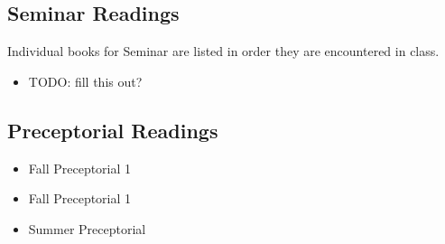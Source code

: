 \documentclass{article}
\begin{document}
\subsection{Seminar Readings}
Individual books for Seminar are listed in order they are encountered in class.

\begin{itemize}
	\item TODO: fill this out?
\end{itemize}

\subsection{Preceptorial Readings}
\begin{itemize}
	\item Fall Preceptorial 1
	      \fallPreceptOneReadingList%
	\item Fall Preceptorial 1
	      \fallPreceptTwoReadingList%
	\item Summer Preceptorial
	      \summerPreceptReadingList%
\end{itemize}

\end{document}
